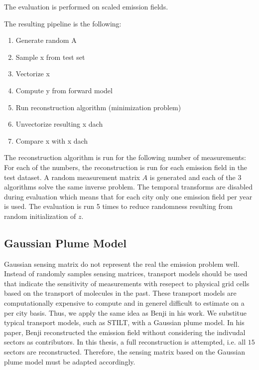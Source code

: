 The evaluation is performed on scaled emission fields.

The resulting pipeline is the following:
\begin{enumerate}
    \item Generate random A
    \item Sample x from test set
    \item Vectorize x
    \item Compute y from forward model
    \item Run reconstruction algorithm (minimization problem)
    \item Unvectorize resulting x dach
    \item Compare x with x dach
\end{enumerate}

The reconstruction algorithm is run for the following number of measurements:
For each of the numbers, the reconstruction is run for each emission field in the test dataset.
A random measurement matrix $A$ is generated and each of the $3$ algorithms solve the same inverse problem.
The temporal transforms are disabled during evaluation which means that for each city only one emission field per year is used.
The evaluation is run 5 times to reduce randomness resulting from random initialization of $z$.

\subsection{Gaussian Plume Model}
Gaussian sensing matrix do not represent the real the emission problem well.
Instead of randomly samples sensing matrices, transport models should be used that indicate the sensitivity of measurements with resepect to physical grid cells based on the transport of molecules in the past.
These transport models are computationally expensive to compute and in generel difficult to estimate on a per city basis.
Thus, we apply the same idea as Benji in his work.
We substitue typical transport models, such as STILT, with a Gaussian plume model.
In his paper, Benji reconstructed the emission field without considering the indivudal sectors as contributors.
In this thesis, a full reconstruction is attempted, i.e. all $15$ sectors are reconstructed.
Therefore, the sensing matrix based on the Gaussian plume model must be adapted accordingly.

